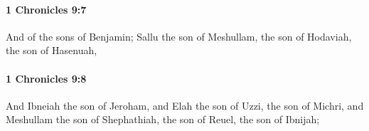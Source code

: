 		\paragraph{1 Chronicles 9:7} %
			\label{1CHRONICLES-9-7}

			And of the sons of Benjamin; Sallu the son of Meshullam, the son of Hodaviah, the son of Hasenuah,


		\paragraph{1 Chronicles 9:8} %
			\label{1CHRONICLES-9-8}

			And Ibneiah the son of Jeroham, and Elah the son of Uzzi, the son of Michri, and Meshullam the son of Shephathiah, the son of Reuel, the son of Ibnijah;


